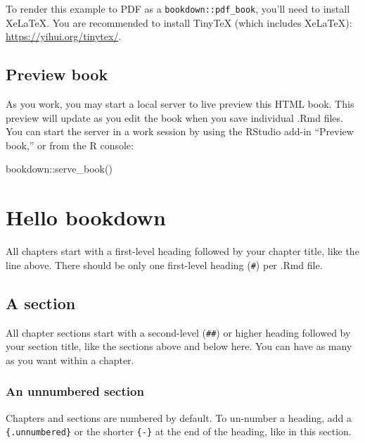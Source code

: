 \documentclass[
]{book}
\newenvironment{Shaded}{\begin{snugshade}}{\end{snugshade}}
\newcommand{\FunctionTok}[1]{\textcolor[rgb]{0.00,0.00,0.00}{#1}}
\newcommand{\NormalTok}[1]{#1}
\newcommand{\SpecialCharTok}[1]{\textcolor[rgb]{0.00,0.00,0.00}{#1}}
\theoremstyle{definition}
\theoremstyle{definition}
\theoremstyle{definition}
\theoremstyle{definition}
\theoremstyle{remark}
\begin{document}
To render this example to PDF as a \texttt{bookdown::pdf\_book}, you'll need to install XeLaTeX. You are recommended to install TinyTeX (which includes XeLaTeX): \url{https://yihui.org/tinytex/}.

\hypertarget{preview-book}{%
\section{Preview book}\label{preview-book}}

As you work, you may start a local server to live preview this HTML book. This preview will update as you edit the book when you save individual .Rmd files. You can start the server in a work session by using the RStudio add-in ``Preview book,'' or from the R console:

\begin{Shaded}
\begin{Highlighting}[]
\NormalTok{bookdown}\SpecialCharTok{::}\FunctionTok{serve\_book}\NormalTok{()}
\end{Highlighting}
\end{Shaded}

\hypertarget{hello-bookdown}{%
\chapter{Hello bookdown}\label{hello-bookdown}}

All chapters start with a first-level heading followed by your chapter title, like the line above. There should be only one first-level heading (\texttt{\#}) per .Rmd file.

\hypertarget{a-section}{%
\section{A section}\label{a-section}}

All chapter sections start with a second-level (\texttt{\#\#}) or higher heading followed by your section title, like the sections above and below here. You can have as many as you want within a chapter.

\hypertarget{an-unnumbered-section}{%
\subsection*{An unnumbered section}\label{an-unnumbered-section}}

Chapters and sections are numbered by default. To un-number a heading, add a \texttt{\{.unnumbered\}} or the shorter \texttt{\{-\}} at the end of the heading, like in this section.
\end{document}
